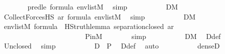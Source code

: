 \begin{isabellebody}
\ \ \ \ \ \ \isamarkupfalse%
\ pred{\isacharunderscore}{\kern0pt}le\ {\isacartoucheopen}{\isasymphi}{\isasymin}formula{\isacartoucheclose}\ {\isacartoucheopen}env{\isasymin}list{\isacharparenleft}{\kern0pt}M{\isacharparenright}{\kern0pt}{\isacartoucheclose}\ \isamarkupfalse%
\ simp\isanewline
\ \ \ \ \isamarkupfalse%
\isanewline
\ \ \ \ \isamarkupfalse%
\ {\isachardoublequoteopen}{\isacharquery}{\kern0pt}D{}{\isasymin}M{\isachardoublequoteclose}\ \isamarkupfalse%
\ Collect{\isacharunderscore}{\kern0pt}ForcesHS\ ar{\isasymphi}\ {\isacartoucheopen}{\isasymphi}{\isasymin}formula{\isacartoucheclose}\ {\isacartoucheopen}env{\isasymin}list{\isacharparenleft}{\kern0pt}M{\isacharparenright}{\kern0pt}{\isacartoucheclose}\ \isamarkupfalse%
\ simp\isanewline
\ \ \ \ \isamarkupfalse%
\isanewline
\ \ \ \ \isamarkupfalse%
\ {\isachardoublequoteopen}{\isacharquery}{\kern0pt}D{}{\isasymin}M{\isachardoublequoteclose}\ \isamarkupfalse%
\ {\isacartoucheopen}env{\isasymin}list{\isacharparenleft}{\kern0pt}M{\isacharparenright}{\kern0pt}{\isacartoucheclose}\ {\isacartoucheopen}{\isasymphi}{\isasymin}formula{\isacartoucheclose}\ \ HS{\isacharunderscore}{\kern0pt}truth{\isacharunderscore}{\kern0pt}lemma{\isacharprime}{\kern0pt}\ separation{\isacharunderscore}{\kern0pt}closed\ ar{\isasymphi}\isanewline
\ \ \ \ \ \ \ \ \ \ \ \ \ \ \ \ \ \ \ \ \ \ \ \ P{\isacharunderscore}{\kern0pt}in{\isacharunderscore}{\kern0pt}M\isanewline
\ \ \ \ \ \ \isamarkupfalse%
\ simp\isanewline
\ \ \ \ \isamarkupfalse%
\isanewline
\ \ \ \ \isamarkupfalse%
\ {\isachardoublequoteopen}D{\isasymin}M{\isachardoublequoteclose}\ \isamarkupfalse%
\ D{\isacharunderscore}{\kern0pt}def\ \isamarkupfalse%
\ Un{\isacharunderscore}{\kern0pt}closed\ \isamarkupfalse%
\ simp\isanewline
\ \ \ \ \isamarkupfalse%
\isanewline
\ \ \ \ \isamarkupfalse%
\ {\isachardoublequoteopen}D\ {\isasymsubseteq}\ P{\isachardoublequoteclose}\ \isamarkupfalse%
\ D{\isacharunderscore}{\kern0pt}def\ \isamarkupfalse%
\ auto\isanewline
\ \ \ \ \isamarkupfalse%
\isanewline
\ \ \ \ \isamarkupfalse%
\ {\isachardoublequoteopen}dense{\isacharparenleft}{\kern0pt}D{\isacharparenright}{\kern0pt}{\isachardoublequoteclose}\ \isanewline
\ \ \ \ \isamarkupfalse%

\end{isabellebody}
